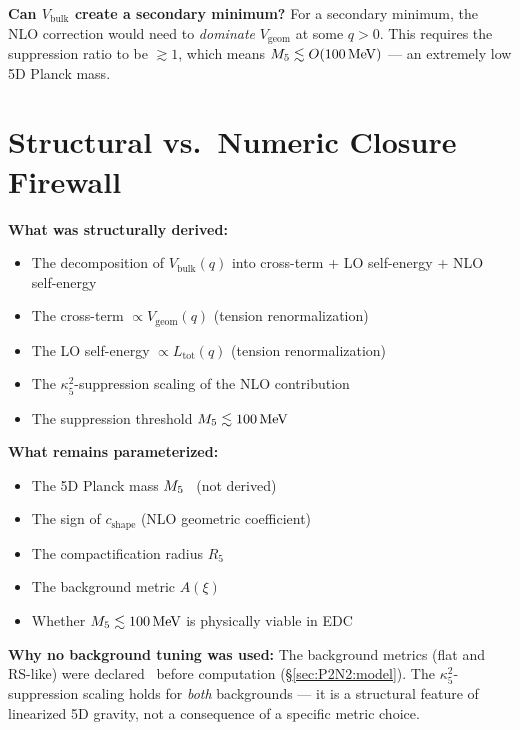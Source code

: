 \textbf{Can $V_{\mathrm{bulk}}$ create a secondary minimum?}
For a secondary minimum, the NLO correction would need to
\emph{dominate} $V_{\mathrm{geom}}$ at some $q > 0$. This requires
the suppression ratio to be $\gtrsim 1$, which means
$M_5 \lesssim O(100\,\mathrm{MeV})$ --- an extremely low 5D Planck mass.

\section{Structural vs.\ Numeric Closure Firewall}
\label{sec:P2N2:firewall}

\textbf{What was structurally derived:}
\begin{itemize}
    \item The decomposition of $V_{\mathrm{bulk}}(q)$ into cross-term
          + LO self-energy + NLO self-energy \tagDc
    \item The cross-term $\propto V_{\mathrm{geom}}(q)$ (tension
          renormalization) \tagDc
    \item The LO self-energy $\propto L_{\mathrm{tot}}(q)$ (tension
          renormalization) \tagDc
    \item The $\kappa_5^2$-suppression scaling of the NLO contribution
          \tagDc
    \item The suppression threshold $M_5 \lesssim 100\,\mathrm{MeV}$ \tagDc
\end{itemize}

\textbf{What remains parameterized:}
\begin{itemize}
    \item The 5D Planck mass $M_5$ \tagP\ (not derived)
    \item The sign of $c_{\mathrm{shape}}$ (NLO geometric coefficient)
          \tagOpen
    \item The compactification radius $R_5$ \tagP
    \item The background metric $A(\xi)$ \tagP
    \item Whether $M_5 \lesssim 100\,\mathrm{MeV}$ is physically viable
          in EDC \tagOpen
\end{itemize}

\textbf{Why no background tuning was used:} The background metrics
(flat and RS-like) were declared \tagP\ before computation
(\S\ref{sec:P2N2:model}). The $\kappa_5^2$-suppression scaling
holds for \emph{both} backgrounds --- it is a structural feature of
linearized 5D gravity, not a consequence of a specific metric choice.


